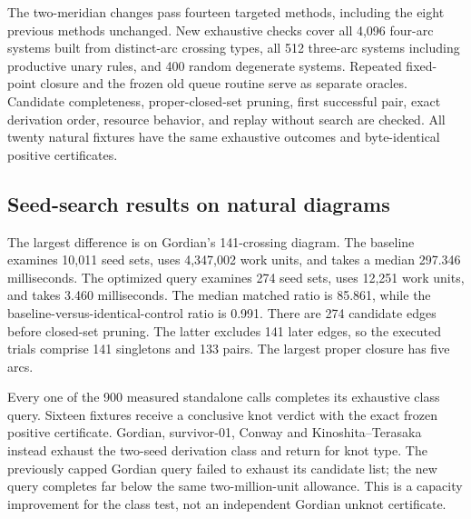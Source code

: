 The two-meridian changes pass fourteen targeted methods, including the
eight previous methods unchanged. New exhaustive checks cover all 4,096
four-arc systems built from distinct-arc crossing types, all 512 three-arc
systems including productive unary rules, and 400 random degenerate
systems. Repeated fixed-point closure and the frozen old queue routine
serve as separate oracles. Candidate completeness, proper-closed-set
pruning, first successful pair, exact derivation order, resource behavior,
and replay without search are checked. All twenty natural fixtures have
the same exhaustive outcomes and byte-identical positive certificates.



\subsection{Seed-search results on natural diagrams}



The largest difference is on Gordian's 141-crossing diagram. The baseline
examines 10,011 seed sets, uses 4,347,002 work units, and takes a median
297.346 milliseconds. The optimized query examines 274 seed sets, uses
12,251 work units, and takes 3.460 milliseconds. The median matched ratio
is 85.861, while the baseline-versus-identical-control ratio is 0.991.
There are 274 candidate edges before closed-set pruning. The latter
excludes 141 later edges, so the executed trials comprise 141 singletons
and 133 pairs. The largest proper closure has five arcs.

Every one of the 900 measured standalone calls completes its exhaustive
class query. Sixteen fixtures receive a conclusive knot verdict with
the exact frozen positive certificate. Gordian, survivor-01, Conway and
Kinoshita--Terasaka instead exhaust the two-seed derivation class and
return  for knot type. The previously capped Gordian
query failed to exhaust its candidate list; the new query completes far
below the same two-million-unit allowance. This is a capacity improvement
for the class test, not an independent Gordian unknot certificate.

